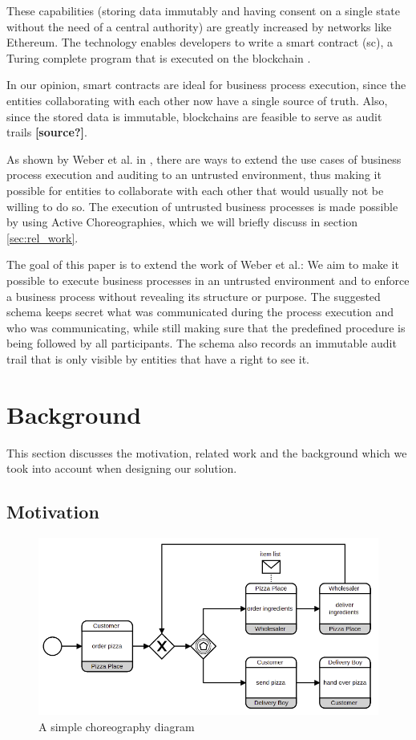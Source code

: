 \documentclass[runningheads]{llncs}
\begin{document}
These capabilities (storing data immutably and having consent on a single state without the need of a central authority) are greatly increased by networks like Ethereum. The technology enables developers to write a smart contract (sc), a Turing complete program that is executed on the blockchain \cite{buterin2014next}.

In our opinion, smart contracts are ideal for business process execution, since the entities collaborating with each other now have a single source of truth. Also, since the stored data is immutable, blockchains are feasible to serve as audit trails \textbf{[source?]}.

As shown by Weber et al. in \cite{weber2016untrusted}, there are ways to extend the use cases of business process execution and auditing to an untrusted environment, thus making it possible for entities to collaborate with each other that would usually not be willing to do so. The execution of untrusted business processes is made possible by using Active Choreographies, which we will briefly discuss in section \ref{sec:rel_work}.

The goal of this paper is to extend the work of Weber et al.: We aim to make it possible to execute business processes in an untrusted environment and to enforce a business process without revealing its structure or purpose. The suggested schema keeps secret what was communicated during the process execution and who was communicating, while still making sure that the predefined procedure is being followed by all participants. The schema also records an immutable audit trail that is only visible by entities that have a right to see it. 


\section{Background} \label{sec:background}

This section discusses the motivation, related work and the background which we took into account when designing our solution.


\subsection{Motivation} \label{sec:motivation}


\begin{figure}
    \centering
    \includegraphics[scale=0.6]{bpmn.png}
    \caption{A simple choreography diagram}
    \label{fig:simple_bpmn}
\end{figure}
\end{document}
